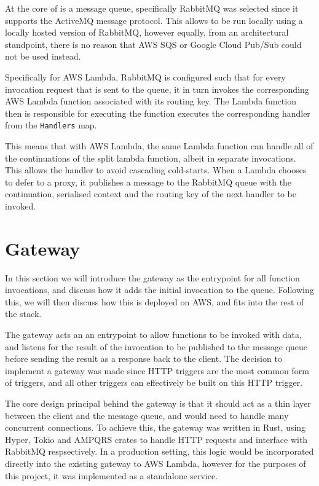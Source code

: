 At the core of \faaas{} is a message queue, specifically RabbitMQ was selected since it supports the ActiveMQ message protocol. This allows \faaas{} to be run locally using a locally hosted version of RabbitMQ, however equally, from an architectural standpoint, there is no reason that AWS SQS or Google Cloud Pub/Sub could not be used instead.

Specifically for AWS Lambda, RabbitMQ is configured such that for every invocation request that is sent to the queue, it in turn invokes the corresponding AWS Lambda function associated with its routing key. The Lambda function then is responsible for executing the function executes the corresponding handler from the \verb|Handlers| map.

This means that with AWS Lambda, the same Lambda function can handle all of the continuations of the split lambda function, albeit in separate invocations. This allows the handler to avoid cascading cold-starts. When a Lambda chooses to defer to a proxy, it publishes a message to the RabbitMQ queue with the continuation, serialised context and the routing key of the next handler to be invoked.

\section{Gateway}
In this section we will introduce the gateway as the entrypoint for all function invocations, and discuss how it adds the initial invocation to the queue. Following this, we will then discuss how this is deployed on AWS, and fits into the rest of the stack.

The gateway acts an an entrypoint to allow functions to be invoked with data, and listens for the result of the invocation to be published to the message queue before sending the result as a response back to the client. The decision to implement a gateway was made since HTTP triggers are the most common form of triggers\cite{eismannReviewServerlessUse2020}, and all other triggers can effectively be built on this HTTP trigger.

The core design principal behind the gateway is that it should act as a thin layer between the client and the message queue, and would need to handle many concurrent connections. To achieve this, the gateway was written in Rust, using Hyper, Tokio and AMPQRS crates to handle HTTP requests and interface with RabbitMQ respsectively. In a production setting, this logic would be incorporated directly into the existing gateway to AWS Lambda, however for the purposes of this project, it was implemented as a standalone service.

